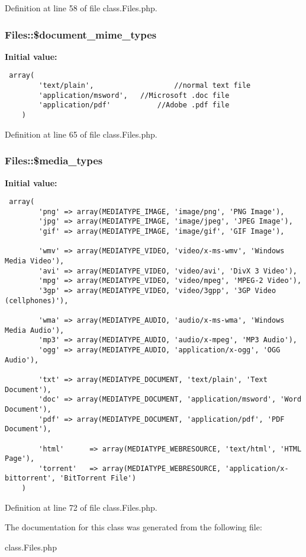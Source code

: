 Definition at line 58 of file class.Files.php.
\subsubsection{\setlength{\rightskip}{0pt plus 5cm}Files::\$document\_\-mime\_\-types}\label{classFiles_34954bd2f1f4320d1c8b80e876d61000}


\textbf{Initial value:}

\begin{Code}\begin{verbatim} array(
        'text/plain',                   //normal text file
        'application/msword',   //Microsoft .doc file
        'application/pdf'           //Adobe .pdf file
    )
\end{verbatim}
\end{Code}


Definition at line 65 of file class.Files.php.
\subsubsection{\setlength{\rightskip}{0pt plus 5cm}Files::\$media\_\-types}\label{classFiles_385df75e2f189c1b5969d6968c9807cb}


\textbf{Initial value:}

\begin{Code}\begin{verbatim} array(
        'png' => array(MEDIATYPE_IMAGE, 'image/png', 'PNG Image'),
        'jpg' => array(MEDIATYPE_IMAGE, 'image/jpeg', 'JPEG Image'),
        'gif' => array(MEDIATYPE_IMAGE, 'image/gif', 'GIF Image'),

        'wmv' => array(MEDIATYPE_VIDEO, 'video/x-ms-wmv', 'Windows Media Video'),
        'avi' => array(MEDIATYPE_VIDEO, 'video/avi', 'DivX 3 Video'),
        'mpg' => array(MEDIATYPE_VIDEO, 'video/mpeg', 'MPEG-2 Video'),
        '3gp' => array(MEDIATYPE_VIDEO, 'video/3gpp', '3GP Video (cellphones)'),

        'wma' => array(MEDIATYPE_AUDIO, 'audio/x-ms-wma', 'Windows Media Audio'),
        'mp3' => array(MEDIATYPE_AUDIO, 'audio/x-mpeg', 'MP3 Audio'),
        'ogg' => array(MEDIATYPE_AUDIO, 'application/x-ogg', 'OGG Audio'),

        'txt' => array(MEDIATYPE_DOCUMENT, 'text/plain', 'Text Document'),
        'doc' => array(MEDIATYPE_DOCUMENT, 'application/msword', 'Word Document'),
        'pdf' => array(MEDIATYPE_DOCUMENT, 'application/pdf', 'PDF Document'),

        'html'      => array(MEDIATYPE_WEBRESOURCE, 'text/html', 'HTML Page'),
        'torrent'   => array(MEDIATYPE_WEBRESOURCE, 'application/x-bittorrent', 'BitTorrent File')
    )
\end{verbatim}
\end{Code}


Definition at line 72 of file class.Files.php.

The documentation for this class was generated from the following file:\begin{CompactItemize}
\item 
class.Files.php\end{CompactItemize}
